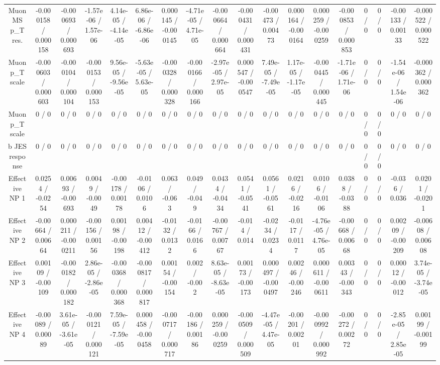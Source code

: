 \documentclass[10pt]{article}
\begin{document}
\begin{table}[htbp]
\begin{center}
\begin{tabular}{|c|c|c|c|c|c|c|c|c|c|c|c|c|c|c|c|c|c|}
  Muon MS p_{T} res. & -0.000158 / 0.000158 & -0.000693 / 0.000693 & -1.57e-06 / 1.57e-06 & 4.14e-05 / -4.14e-05 & 6.86e-06 / -6.86e-06 & 0.000145 / -0.000145 & -4.71e-05 / 4.71e-05 & -0.000664 / 0.000664 & -0.000431 / 0.000431 & -0.00473 / 0.00473 & 0.000164 / -0.000164 & 0.000259 / -0.000259 & -0.000853 / 0.000853 & 0 / 0 & 0 / 0 & -0.00133 / 0.00133 & -0.000522 / 0.000522 \\ 
  Muon p_{T} scale & -0.000603 / 0.000603 & -0.000104 / 0.000104 & -0.000153 / 0.000153 & 9.56e-05 / -9.56e-05 & -5.63e-05 / 5.63e-05 & -0.000328 / 0.000328 & -0.000166 / 0.000166 & -2.97e-05 / 2.97e-05 & 0.000547 / -0.000547 & 7.49e-05 / -7.49e-05 & 1.17e-05 / -1.17e-05 & -0.000445 / 0.000445 & -1.71e-06 / 1.71e-06 & 0 / 0 & 0 / 0 & -1.54e-06 / 1.54e-06 & -0.000362 / 0.000362 \\ 
  Muon p_{T} scale & 0 / 0 & 0 / 0 & 0 / 0 & 0 / 0 & 0 / 0 & 0 / 0 & 0 / 0 & 0 / 0 & 0 / 0 & 0 / 0 & 0 / 0 & 0 / 0 & 0 / 0 & 0 / 0 & 0 / 0 & 0 / 0 & 0 / 0 \\ 
  b JES response & 0 / 0 & 0 / 0 & 0 / 0 & 0 / 0 & 0 / 0 & 0 / 0 & 0 / 0 & 0 / 0 & 0 / 0 & 0 / 0 & 0 / 0 & 0 / 0 & 0 / 0 & 0 / 0 & 0 / 0 & 0 / 0 & 0 / 0 \\ 
  Effective NP 1 & 0.0254 / -0.0254 & 0.00693 / -0.00693 & 0.0049 / -0.0049 & -0.00178 / 0.00178 & -0.0106 / 0.0106 & 0.063 / -0.063 & 0.049 / -0.049 & 0.0434 / -0.0434 & 0.0541 / -0.0541 & 0.0561 / -0.0561 & 0.0216 / -0.0216 & 0.0106 / -0.0106 & 0.0388 / -0.0388 & 0 / 0 & 0 / 0 & -0.036 / 0.036 & 0.0201 / -0.0201 \\ 
  Effective NP 2 & -0.00664 / 0.00664 & 0.000211 / -0.000211 & -0.00156 / 0.00156 & 0.00198 / -0.00198 & 0.00412 / -0.00412 & -0.0132 / 0.0132 & -0.0166 / 0.0166 & -0.00767 / 0.00767 & -0.014 / 0.014 & -0.0234 / 0.0234 & -0.0117 / 0.0117 & -4.76e-05 / 4.76e-05 & -0.00668 / 0.00668 & 0 / 0 & 0 / 0 & 0.00209 / -0.00209 & -0.00608 / 0.00608 \\ 
  Effective NP 3 & 0.00109 / -0.00109 & -0.000182 / 0.000182 & 2.86e-05 / -2.86e-05 & -0.000368 / 0.000368 & -0.000817 / 0.000817 & 0.00154 / -0.00154 & 0.002 / -0.002 & 8.63e-05 / -8.63e-05 & 0.00173 / -0.00173 & 0.000497 / -0.000497 & 0.00246 / -0.00246 & 0.000611 / -0.000611 & 0.00343 / -0.00343 & 0 / 0 & 0 / 0 & 0.00012 / -0.00012 & 3.74e-05 / -3.74e-05 \\ 
  Effective NP 4 & -0.00089 / 0.00089 & 3.61e-05 / -3.61e-05 & -0.000121 / 0.000121 & 7.59e-05 / -7.59e-05 & 0.000458 / -0.000458 & -0.000717 / 0.000717 & -0.00186 / 0.00186 & 0.000259 / -0.000259 & -0.000509 / 0.000509 & -4.47e-05 / 4.47e-05 & -0.00201 / 0.00201 & -0.000992 / 0.000992 & -0.00272 / 0.00272 & 0 / 0 & 0 / 0 & -2.85e-05 / 2.85e-05 & 0.00199 / -0.00199 \\ 

\end{tabular}
\end{center}
\end{table}
\end{document}
